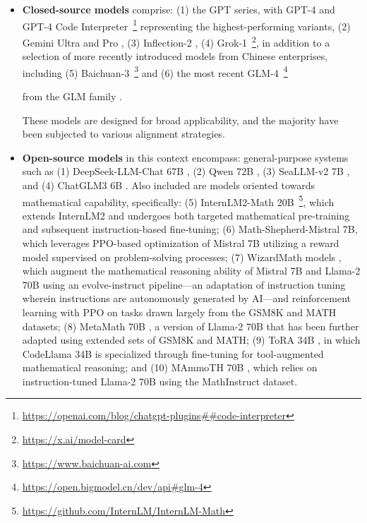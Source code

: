 \begin{itemize}[topsep=0pt]
\begin{itemize}[topsep=0pt]
    \item \textbf{Closed-source models} comprise: (1) the GPT series, with GPT-4 \citep{gpt4} and GPT-4 Code Interpreter~\footnote{\url{https://openai.com/blog/chatgpt-plugins\#\#code-interpreter}} representing the highest-performing variants, (2) Gemini Ultra and Pro \citep{gemini}, (3) Inflection-2 \citep{inflection-2}, (4) Grok-1~\footnote{\url{https://x.ai/model-card}}, in addition to a selection of more recently introduced models from Chinese enterprises, including (5) Baichuan-3~\footnote{\url{https://www.baichuan-ai.com}} and (6) the most recent GLM-4~\footnote{\url{https://open.bigmodel.cn/dev/api\#glm-4}}

    from the GLM family \citep{glm}.

These models are designed for broad applicability, and the majority have been subjected to various alignment strategies. 
    \item \textbf{Open-source models} in this context encompass: general-purpose systems such as (1) DeepSeek-LLM-Chat 67B \citep{deepseek-llm}, (2) Qwen 72B \citep{qwen}, (3) SeaLLM-v2 7B \citep{seallm}, and (4) ChatGLM3 6B \citep{chatglm3}. Also included are models oriented towards mathematical capability, specifically: (5) InternLM2-Math 20B~\footnote{\url{https://github.com/InternLM/InternLM-Math}}, which extends InternLM2 and undergoes both targeted mathematical pre-training and subsequent instruction-based fine-tuning; (6) Math-Shepherd-Mistral 7B, which leverages PPO-based optimization \citep{schulman2017proximal} of Mistral 7B \citep{mistral} utilizing a reward model supervised on problem-solving processes; (7) WizardMath models \citep{wizardmath}, which augment the mathematical reasoning ability of Mistral 7B and Llama-2 70B \citep{llama2} using an evolve-instruct pipeline—an adaptation of instruction tuning wherein instructions are autonomously generated by AI—and reinforcement learning with PPO on tasks drawn largely from the GSM8K and MATH datasets; (8) MetaMath 70B \citep{metamath}, a version of Llama-2 70B that has been further adapted using extended sets of GSM8K and MATH; (9) ToRA 34B \cite{tora}, in which CodeLlama 34B is specialized through fine-tuning for tool-augmented mathematical reasoning; and (10) MAmmoTH 70B \citep{MathInstruct}, which relies on instruction-tuned Llama-2 70B using the MathInstruct dataset.


\end{itemize}
\end{itemize}

